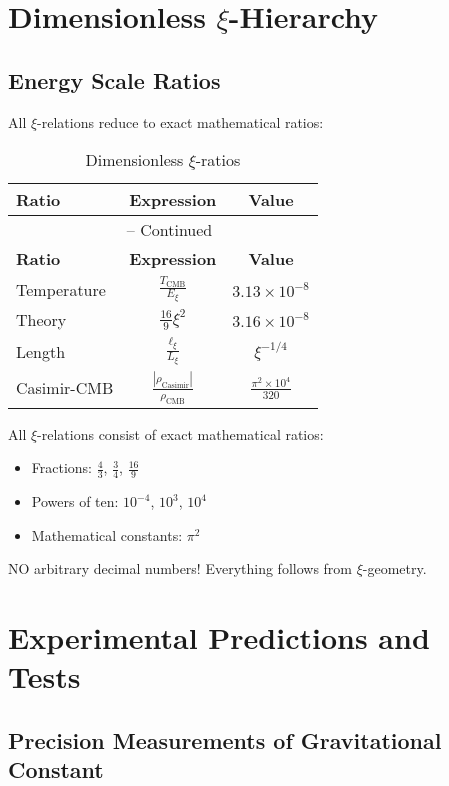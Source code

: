 \documentclass[12pt,a4paper]{article}
\begin{document}
	\section{Dimensionless $\xi$-Hierarchy}
	
	\subsection{Energy Scale Ratios}
	
	All $\xi$-relations reduce to exact mathematical ratios:
	
	\begin{longtable}{lcc}
		\caption{Dimensionless $\xi$-ratios} \\
		\toprule
		\textbf{Ratio} & \textbf{Expression} & \textbf{Value} \\
		\midrule
		\endfirsthead
		\multicolumn{3}{c}{\tablename\ \thetable{} -- Continued} \\
		\toprule
		\textbf{Ratio} & \textbf{Expression} & \textbf{Value} \\
		\midrule
		\endhead
		Temperature & $\frac{T_{\text{CMB}}}{E_\xi}$ & $3.13 \times 10^{-8}$ \\
		Theory & $\frac{16}{9}\xi^2$ & $3.16 \times 10^{-8}$ \\
		Length & $\frac{\ell_{\xi}}{L_\xi}$ & $\xi^{-1/4}$ \\
		Casimir-CMB & $\frac{|\rho_{\text{Casimir}}|}{\rho_{\text{CMB}}}$ & $\frac{\pi^2 \times 10^4}{320}$ \\
		\bottomrule
	\end{longtable}
	
	\begin{important}
		All $\xi$-relations consist of exact mathematical ratios:
		\begin{itemize}
			\item Fractions: $\frac{4}{3}$, $\frac{3}{4}$, $\frac{16}{9}$
			\item Powers of ten: $10^{-4}$, $10^3$, $10^4$
			\item Mathematical constants: $\pi^2$
		\end{itemize}
		NO arbitrary decimal numbers! Everything follows from $\xi$-geometry.
	\end{important}
	
	\section{Experimental Predictions and Tests}
	
	\subsection{Precision Measurements of Gravitational Constant}
	
\end{document}
